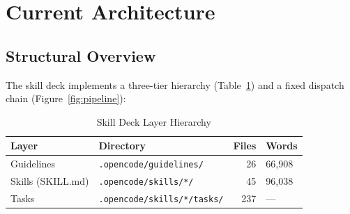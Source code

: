 \documentclass[11pt,a4paper]{article}
\begin{document}
\newpage

\section{Current Architecture}

\subsection{Structural Overview}

The skill deck implements a three-tier hierarchy (Table~\ref{tab:tiers}) and a fixed dispatch chain (Figure~\ref{fig:pipeline}):

\begin{table}[htbp]
\centering
\caption{Skill Deck Layer Hierarchy}
\label{tab:tiers}
\begin{tabular}{@{}llrl@{}}
\toprule
\textbf{Layer}    & \textbf{Directory}                & \textbf{Files} & \textbf{Words} \\
\midrule
Guidelines        & \texttt{.opencode/guidelines/}    & 26             & 66,908          \\
Skills (SKILL.md) & \texttt{.opencode/skills/*/}      & 45             & 96,038          \\
Tasks             & \texttt{.opencode/skills/*/tasks/}& 237            & ---             \\
\bottomrule
\end{tabular}
\end{table}
\end{document}
